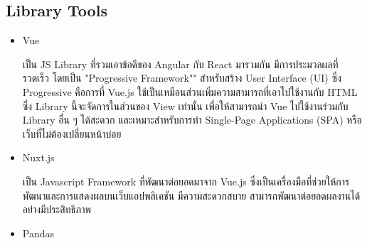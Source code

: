 \documentclass[12pt,oneside,openright,a4paper]{cpe-thai-project}
\begin{document}
  \subsection{Library Tools}
    \begin{itemize}
      

      

      \item Vue
      
      \hspace{1cm}เป็น JS Library ที่รวมเอาข้อดีของ Angular กับ React มารวมกัน มีการประมวลผลที่รวดเร็ว \cite{vue1}
      โดยเป็น "Progressive Framework"" สำหรับสร้าง User Interface (UI) ซึ่ง Progressive คือการที่ Vue.js ใช้เป็นเหมือนส่วนเพิ่มความสามารถที่เอาไปใช้งานกับ HTML 
      ซึ่ง Library นี้จะจัดการในส่วนของ View เท่านั้น เพื่อให้สามารถนำ Vue ไปใช้งานร่วมกับ Library อื่น ๆ ได้สะดวก 
      และเหมาะสำหรับการทำ Single-Page Applications (SPA) หรือเว็บที่ไม่ต้องเปลี่ยนหน้าบ่อย \cite{vue2}

      \item Nuxt.js
      
      \hspace{1cm}เป็น Javascript Framework ที่พัฒนาต่อยอดมาจาก Vue.js ซึ่งเป็นเครื่องมือที่ช่วยให้การพัฒนาและการแสดงผลบนเว็บแอปพลิเคชัน 
      มีความสะดวกสบาย สามารถพัฒนาต่อยอดผลงานได้อย่างมีประสิทธิภาพ \cite{nuxt}
       
      \item Pandas
      

\end{itemize}
\end{document}
